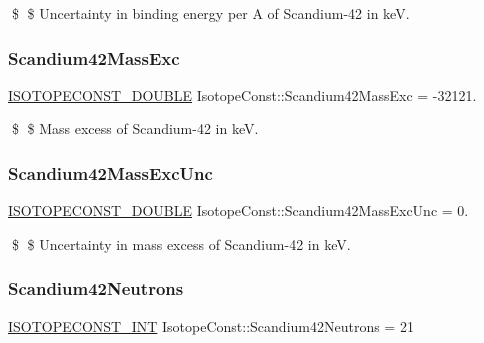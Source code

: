 \$ \$ Uncertainty in binding energy per A of Scandium-\/42 in keV. \mbox{\label{group___isotope_const-_scandium-_sc42_ga597a39a84e847e71cafe8c450ad7d847}} 
\subsubsection{\texorpdfstring{Scandium42\+Mass\+Exc}{Scandium42MassExc}}
{\footnotesize\ttfamily \mbox{\hyperlink{group___isotope_const-_macros_ga8f45a7272ce02c0b4c65c44636ed719a}{I\+S\+O\+T\+O\+P\+E\+C\+O\+N\+S\+T\+\_\+\+D\+O\+U\+B\+LE}} Isotope\+Const\+::\+Scandium42\+Mass\+Exc = -\/32121.}

\$ \$ Mass excess of Scandium-\/42 in keV. \mbox{\label{group___isotope_const-_scandium-_sc42_gafac4ff3df19ee57a79c1db773e4eda14}} 
\subsubsection{\texorpdfstring{Scandium42\+Mass\+Exc\+Unc}{Scandium42MassExcUnc}}
{\footnotesize\ttfamily \mbox{\hyperlink{group___isotope_const-_macros_ga8f45a7272ce02c0b4c65c44636ed719a}{I\+S\+O\+T\+O\+P\+E\+C\+O\+N\+S\+T\+\_\+\+D\+O\+U\+B\+LE}} Isotope\+Const\+::\+Scandium42\+Mass\+Exc\+Unc = 0.}

\$ \$ Uncertainty in mass excess of Scandium-\/42 in keV. \mbox{\label{group___isotope_const-_scandium-_sc42_ga6956977b8469390340ff1355e539602b}} 
\subsubsection{\texorpdfstring{Scandium42\+Neutrons}{Scandium42Neutrons}}
{\footnotesize\ttfamily \mbox{\hyperlink{group___isotope_const-_macros_ga5f18360b3e99483a35c32d789e62621c}{I\+S\+O\+T\+O\+P\+E\+C\+O\+N\+S\+T\+\_\+\+I\+NT}} Isotope\+Const\+::\+Scandium42\+Neutrons = 21}

